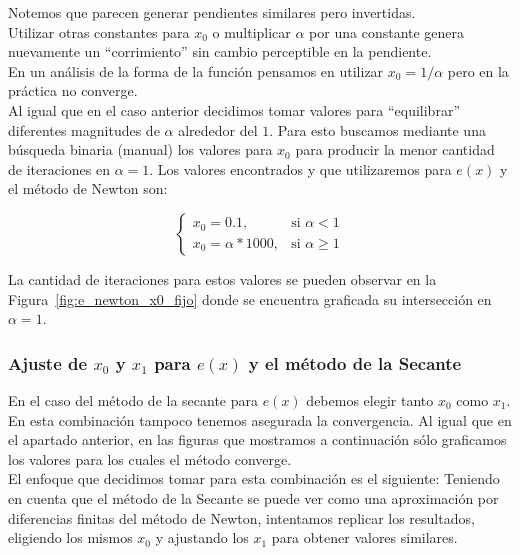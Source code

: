 Notemos que parecen generar pendientes similares pero invertidas.\\

Utilizar otras constantes para $x_0$ o multiplicar $\alpha$ por una constante
genera nuevamente un ``corrimiento'' sin cambio perceptible en la pendiente.\\

En un análisis de la forma de la función pensamos en utilizar $x_0 = 1 /
\alpha$ pero en la práctica no converge.\\

Al igual que en el caso anterior decidimos tomar valores para ``equilibrar''
diferentes magnitudes de $\alpha$ alrededor del $1$. Para esto buscamos
mediante una búsqueda binaria (manual) los valores para $x_0$ para producir la
menor cantidad de iteraciones en $\alpha = 1$. Los valores encontrados y que
utilizaremos para $e(x)$ y el método de Newton son:

\[
\begin{cases}
x_0 = 0.1, & \mbox{si } \alpha < 1\\
x_0 = \alpha * 1000, & \mbox{si } \alpha \ge 1
\end{cases}
\]

La cantidad de iteraciones para estos valores se pueden observar en la
Figura~\ref{fig:e_newton_x0_fijo} donde se encuentra graficada su intersección
en $\alpha = 1$.

\subsubsection{Ajuste de $x_0$ y $x_1$ para $e(x)$ y el método de la Secante}

En el caso del método de la secante para $e(x)$ debemos elegir tanto $x_0$ como
$x_1$. En esta combinación tampoco tenemos asegurada la convergencia. Al igual
que en el apartado anterior, en las figuras que mostramos a continuación sólo
graficamos los valores para los cuales el método converge.\\

El enfoque que decidimos tomar para esta combinación es el siguiente: Teniendo
en cuenta que el método de la Secante se puede ver como una aproximación por
diferencias finitas del método de Newton, intentamos replicar los resultados,
eligiendo los mismos $x_0$ y ajustando los $x_1$ para obtener valores
similares.

